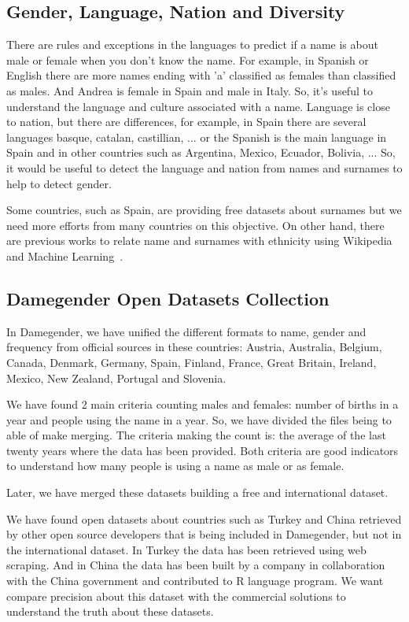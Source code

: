 \documentclass[a4paper]{article}
\begin{document}
\subsection{Gender, Language, Nation and Diversity}
\label{sec:diversity}

There are rules and exceptions in the languages to predict if a name
is about male or female when you don't know the name. For example, in
Spanish or English there are more names ending with 'a' classified as
females than classified as males. And Andrea is female in Spain and
male in Italy. So, it's useful to understand the language and culture
associated with a name. Language is close to nation, but there are
differences, for example, in Spain there are several languages basque,
catalan, castillian, ... or the Spanish is the main language in Spain
and in other countries such as Argentina, Mexico, Ecuador, Bolivia,
... So, it would be useful to detect the language and nation from
names and surnames to help to detect gender.

Some countries, such as Spain, are providing free datasets about
surnames but we need more efforts from many countries on this
objective. On other hand, there are previous works to relate name and
surnames with ethnicity using Wikipedia and Machine
Learning~\cite{ambekar2009name}.

\subsection{Damegender Open Datasets Collection}
\label{sec:damegender}

In Damegender, we have unified the different formats to name, gender
and frequency from official sources in these countries: Austria,
Australia, Belgium, Canada, Denmark, Germany, Spain, Finland, France,
Great Britain, Ireland, Mexico, New Zealand, Portugal and Slovenia.

We have found 2 main criteria counting males and females: number of
births in a year and people using the name in a year. So, we have
divided the files being to able of make merging. The criteria making
the count is: the average of the last twenty years where the data has
been provided. Both criteria are good indicators to understand how
many people is using a name as male or as female.

Later, we have merged these datasets building a free and international
dataset.

We have found open datasets about countries such as Turkey and China
retrieved by other open source developers that is being included in
Damegender, but not in the international dataset. In Turkey the data
has been retrieved using web scraping. And in China the data has been
built by a company in collaboration with the China government and
contributed to R language program. We want compare precision about
this dataset with the commercial solutions to understand the truth
about these datasets.
\end{document}
